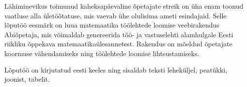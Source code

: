 Lähiminevikus toimunud kaheksapäevaline õpetajate streik on üha enam toonud vaatluse alla ületöötatuse, mis vaevab ühe olulisima ameti esindajaid. Selle lõputöö eesmärk on luua matemaatika töölehtede loomise veebirakendus Abiõpetaja, mis võimaldab genereerida töö- ja vastuselehti alamhulgale Eesti riikliku õppekava matemaatikaülesannetest. Rakendus on mõeldud õpetajate koormuse vähendamiseks ning töölehtede loomise lihtsustamiseks.

Lõputöö on kirjutatud eesti keeles ning sisaldab teksti \totalPageCount{} leheküljel, \totalChapterCount{} peatükki,  joonist,  tabelit.

